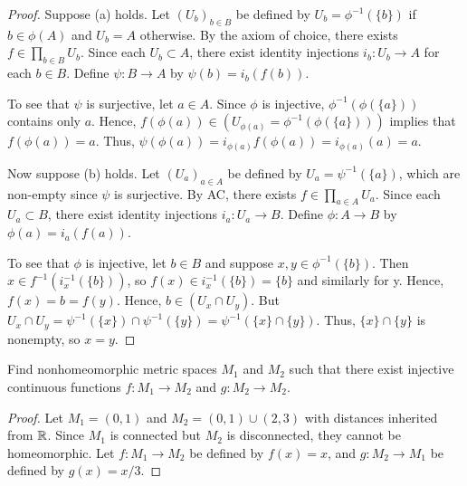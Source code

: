 \documentclass{article}
\begin{document}
\begin{proof}
Suppose (a) holds.  Let $(U_b)_{b \in B}$ be defined by $U_b = \phi^{-1}(\{b\})$ if $b \in \phi(A)$ and $U_b = A$ otherwise.  By the axiom of choice, there exists $f \in \prod_{b \in B} U_b$. Since each $U_b \subset A$, there exist identity injections $i_b:U_b \to A$ for each $b \in B$.  Define $\psi: B \to A$ by $\psi(b) = i_b(f(b))$.

To see that $\psi$ is surjective, let $a \in A$.  Since $\phi$ is injective, $\phi^{-1}(\phi(\{a\}))$ contains only $a$.  Hence, $f(\phi(a)) \in (U_{\phi(a)} = \phi^{-1}(\phi(\{a\})))$ implies that $f(\phi(a)) = a$. Thus, $\psi(\phi(a)) = i_{\phi(a)} f(\phi(a)) = i_{\phi(a)}(a) = a$.

Now suppose (b) holds. Let $(U_a)_{a \in A}$ be defined by $U_a = \psi^{-1}(\{a\})$, which are non-empty since $\psi$ is surjective.   By AC, there exists $f \in \prod_{a \in A} U_a$.  Since each $U_a \subset B$, there exist identity injections $i_a:U_a \to B$.  Define $\phi: A \to B$ by $\phi(a) = i_a(f(a))$.

To see that $\phi$ is injective, let $b \in B$ and suppose $x, y \in \phi^{-1}(\{b\})$. Then $x \in f^{-1}(i_x^{-1}(\{b\}))$, so $f(x) \in i_x^{-1}(\{b\}) = \{b\}$ and similarly for y.  Hence, $f(x) = b = f(y)$.  Hence, $b \in (U_x \cap U_y)$. But $U_x \cap U_y = \psi^{-1}(\{x\}) \cap \psi^{-1}(\{y\}) = \psi^{-1}(\{x\} \cap \{y\})$.  Thus, $\{x\} \cap \{y\}$ is nonempty, so $x = y$.

\end{proof}

 Find nonhomeomorphic metric spaces $M_1$ and $M_2$ such that there exist injective continuous functions $f:M_1 \to M_2$ and $g: M_2 \to M_2$.
\begin{proof}
Let $M_1 = (0,1)$ and $M_2 = (0,1) \cup (2,3)$ with distances inherited from $\mathbb{R}$. Since $M_1$ is connected but $M_2$ is disconnected, they cannot be homeomorphic. Let $f:M_1 \to M_2$ be defined by $f(x) = x$, and  $g:M_2 \to M_1$ be defined by $g(x) = x/3$.
\end{proof}
\end{document}
